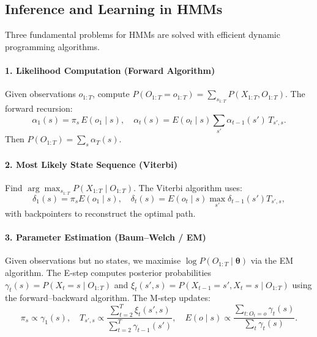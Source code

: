 \documentclass{tufte-handout}
\let\subsubsection\subsection
\begin{document}
\begin{marginfigure}
\centering
{}
\caption{Graphical model of an HMM: hidden states $X_t$ (circle) emit observations $O_t$ (square).}
\end{marginfigure}

\subsubsection{Inference and Learning in HMMs}

Three fundamental problems for HMMs are solved with efficient dynamic programming algorithms.

\paragraph{1. Likelihood Computation (Forward Algorithm)}
Given observations $o_{1:T}$, compute $P(O_{1:T}=o_{1:T}) = \sum_{s_{1:T}} P(X_{1:T}, O_{1:T})$. The forward recursion:
\[
\alpha_1(s) = \pi_s \, E(o_1 \mid s), \quad
\alpha_t(s) = E(o_t \mid s) \sum_{s'} \alpha_{t-1}(s') \, T_{s', s}.
\]
Then $P(O_{1:T}) = \sum_s \alpha_T(s)$.

\paragraph{2. Most Likely State Sequence (Viterbi)}
Find $\arg\max_{s_{1:T}} P(X_{1:T} \mid O_{1:T})$. The Viterbi algorithm uses:
\[
\delta_1(s) = \pi_s E(o_1 \mid s),\quad
\delta_t(s) = E(o_t \mid s) \max_{s'} \delta_{t-1}(s') T_{s', s},
\]
with backpointers to reconstruct the optimal path.

\paragraph{3. Parameter Estimation (Baum–Welch / EM)}
Given observations but no states, we maximise $\log P(O_{1:T} \mid \boldsymbol{\theta})$ via the EM algorithm. The E‑step computes posterior probabilities $\gamma_t(s) = P(X_t=s \mid O_{1:T})$ and $\xi_t(s',s) = P(X_{t-1}=s', X_t=s \mid O_{1:T})$ using the forward–backward algorithm. The M‑step updates:
\[
\pi_s \propto \gamma_1(s),\quad T_{s',s} \propto \frac{\sum_{t=2}^T \xi_t(s',s)}{\sum_{t=2}^T \gamma_{t-1}(s')},\quad
E(o \mid s) \propto \frac{\sum_{t: O_t=o} \gamma_t(s)}{\sum_t \gamma_t(s)}.
\]
\end{document}

